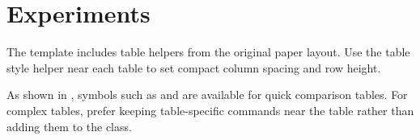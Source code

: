 \section{Experiments}

The template includes table helpers from the original paper layout. Use
the table style helper near each table to set compact column spacing and row
height.



As shown in , symbols such as \texttt{\string\cmark} and
\texttt{\string\xmark} are available for quick comparison tables. For complex
tables, prefer keeping table-specific commands near the table rather than adding
them to the class.

